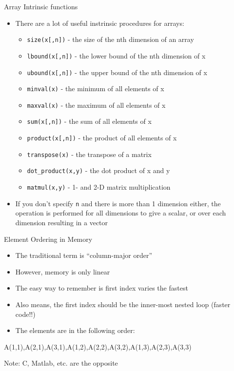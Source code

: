 \documentclass{beamer}
\begin{document}
\begin{frame}{Array Intrinsic functions}

  \begin{itemize}
    \item There are a lot of useful instrinsic procedures for arrays:
    \begin{itemize}
      \item \texttt{size(x[,n])} - the size of the nth dimension of an array
      \item \texttt{lbound(x[,n])} - the lower bound of the nth dimension of x
      \item \texttt{ubound(x[,n])} - the upper bound of the nth dimension of x
      \item \texttt{minval(x)} - the minimum of all elements of x
      \item \texttt{maxval(x)} - the maximum of all elements of x
      \item \texttt{sum(x[,n])} - the sum of all elements of x
      \item \texttt{product(x[,n])} - the product of all elements of x
      \item \texttt{transpose(x)} - the transpose of a matrix
      \item \texttt{dot\_product(x,y)} - the dot product of x and y
      \item \texttt{matmul(x,y)} - 1- and 2-D matrix multiplication
    \end{itemize}
    \item If you don't specify \texttt{n} and there is more than 1 dimension either, the operation is performed for all dimensions to give a scalar, or over each dimension resulting in a vector
  \end{itemize}

\end{frame}
\begin{frame}{Element Ordering in Memory}

  \begin{itemize}
    \item The traditional term is ``column-major order''
    \vfill\item However, memory is only linear
    \vfill\item The easy way to remember is \alert{first index varies the fastest}
    \vfill\item Also means, the first index should be the inner-most nested loop (faster code!!)
    \vfill\item The elements are in the following order: 
  \end{itemize}
A(1,1),A(2,1),A(3,1),A(1,2),A(2,2),A(3,2),A(1,3),A(2,3),A(3,3)

{\begin{center}\color{red} Note: C, Matlab, etc. are the opposite\end{center}} 

\end{frame}
\end{document}

